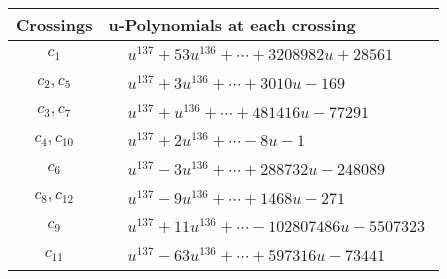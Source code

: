 \documentclass[1p]{elsarticle_modified}
\theoremstyle{definition}
\begin{document}
\begin{tabular}{m{50pt}|m{274pt}}
Crossings & \hspace{64pt}u-Polynomials at each crossing \\
\hline $$\begin{aligned}c_{1}\end{aligned}$$&$\begin{aligned}
&u^{137}+53 u^{136}+\cdots+3208982 u+28561
\end{aligned}$\\
\hline $$\begin{aligned}c_{2},c_{5}\end{aligned}$$&$\begin{aligned}
&u^{137}+3 u^{136}+\cdots+3010 u-169
\end{aligned}$\\
\hline $$\begin{aligned}c_{3},c_{7}\end{aligned}$$&$\begin{aligned}
&u^{137}+u^{136}+\cdots+481416 u-77291
\end{aligned}$\\
\hline $$\begin{aligned}c_{4},c_{10}\end{aligned}$$&$\begin{aligned}
&u^{137}+2 u^{136}+\cdots-8 u-1
\end{aligned}$\\
\hline $$\begin{aligned}c_{6}\end{aligned}$$&$\begin{aligned}
&u^{137}-3 u^{136}+\cdots+288732 u-248089
\end{aligned}$\\
\hline $$\begin{aligned}c_{8},c_{12}\end{aligned}$$&$\begin{aligned}
&u^{137}-9 u^{136}+\cdots+1468 u-271
\end{aligned}$\\
\hline $$\begin{aligned}c_{9}\end{aligned}$$&$\begin{aligned}
&u^{137}+11 u^{136}+\cdots-102807486 u-5507323
\end{aligned}$\\
\hline $$\begin{aligned}c_{11}\end{aligned}$$&$\begin{aligned}
&u^{137}-63 u^{136}+\cdots+597316 u-73441
\end{aligned}$\\
\hline
\end{tabular}\\~\\
\end{document}
